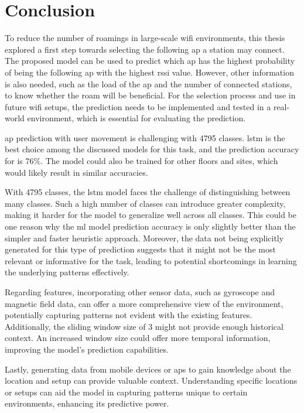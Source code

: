 \chapter{Conclusion}\label{ch:conclusion}
 
To reduce the number of roamings in large-scale \ac{wifi} environments, this thesis explored a first step towards selecting the following \ac{ap} a station may connect.
The proposed model can be used to predict which \ac{ap} has the highest probability of being the following \ac{ap} with the highest \ac{rssi} value. However, other information is also needed, such as the load of the \ac{ap} and the number of connected stations, to know whether the roam will be beneficial.
For the selection process and use in future \ac{wifi} setups, the prediction needs to be implemented and tested in a real-world environment, which is essential for evaluating the prediction.

\ac{ap} prediction with user movement is challenging with 4795 classes.
\ac{lstm} is the best choice among the discussed models for this task, and the prediction accuracy for \threeAP is 76\%.
The model could also be trained for other floors and sites, which would likely result in similar accuracies.

With 4795 classes, the \ac{lstm} model faces the challenge of distinguishing between many classes.
Such a high number of classes can introduce greater complexity, making it harder for the model to generalize well across all classes.
This could be one reason why the \ac{ml} model prediction accuracy is only slightly better than the simpler and faster heuristic approach.
Moreover, the data not being explicitly generated for this type of prediction suggests that it might not be the most relevant or informative for the task, leading to potential shortcomings in learning the underlying patterns effectively.

Regarding features, incorporating other sensor data, such as gyroscope and magnetic field data, can offer a more comprehensive view of the environment, potentially capturing patterns not evident with the existing features.
Additionally, the sliding window size of 3 might not provide enough historical context. An increased window size could offer more temporal information, improving the model's prediction capabilities.

Lastly, generating data from mobile devices or \acp{ap} to gain knowledge about the location and setup can provide valuable context.
Understanding specific locations or setups can aid the model in capturing patterns unique to certain environments, enhancing its predictive power.

